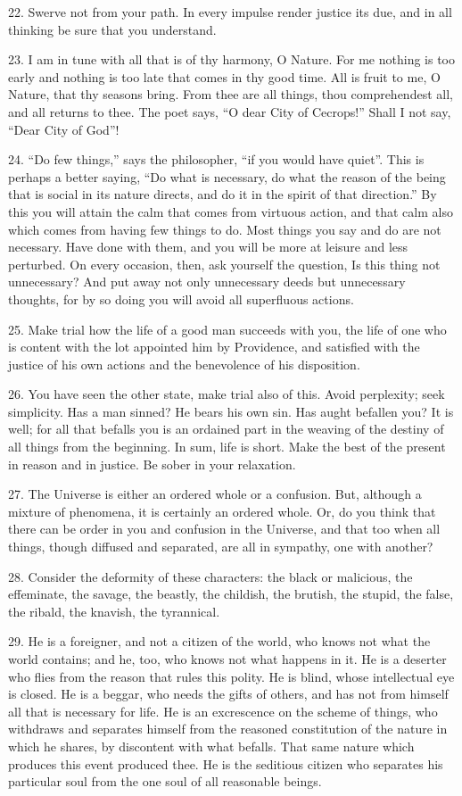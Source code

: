 \documentclass{book}
\begin{document}
22. Swerve not from your path. In every impulse render justice its
due, and in all thinking be sure that you understand.

23. I am in tune with all that is of thy harmony, O Nature. For me
nothing is too early and nothing is too late that comes in thy good
time. All is fruit to me, O Nature, that thy seasons bring. From thee
are all things, thou comprehendest all, and all returns to thee. The
poet says, ``O dear City of Cecrops!'' Shall I not say, ``Dear City of
God''!

24. ``Do few things,'' says the philosopher, ``if you would have quiet''.
This is perhaps a better saying, ``Do what is necessary, do what the
reason of the being that is social in its nature directs, and do it in
the spirit of that direction.'' By this you will attain the calm that
comes from virtuous action, and that calm also which comes from having
few things to do. Most things you say and do are not necessary. Have
done with them, and you will be more at leisure and less perturbed. On
every occasion, then, ask yourself the question, Is this thing not
unnecessary? And put away not only unnecessary deeds but unnecessary
thoughts, for by so doing you will avoid all superfluous actions.

25. Make trial how the life of a good man succeeds with you, the life
of one who is content with the lot appointed him by Providence, and
satisfied with the justice of his own actions and the benevolence of
his disposition.

26. You have seen the other state, make trial also of this. Avoid
perplexity; seek simplicity. Has a man sinned? He bears his own
sin. Has aught befallen you? It is well; for all that befalls you is
an ordained part in the weaving of the destiny of all things from the
beginning. In sum, life is short. Make the best of the present in
reason and in justice. Be sober in your relaxation.

27. The Universe is either an ordered whole or a confusion. But,
although a mixture of phenomena, it is certainly an ordered whole. Or,
do you think that there can be order in you and confusion in the
Universe, and that too when all things, though diffused and separated,
are all in sympathy, one with another?

28. Consider the deformity of these characters: the black or
malicious, the effeminate, the savage, the beastly, the childish, the
brutish, the stupid, the false, the ribald, the knavish, the
tyrannical.

29. He is a foreigner, and not a citizen of the world, who knows not
what the world contains; and he, too, who knows not what happens in
it. He is a deserter who flies from the reason that rules this
polity. He is blind, whose intellectual eye is closed. He is a beggar,
who needs the gifts of others, and has not from himself all that is
necessary for life. He is an excrescence on the scheme of things, who
withdraws and separates himself from the reasoned constitution of the
nature in which he shares, by discontent with what befalls. That same
nature which produces this event produced thee. He is the seditious
citizen who separates his particular soul from the one soul of all
reasonable beings.
\end{document}

